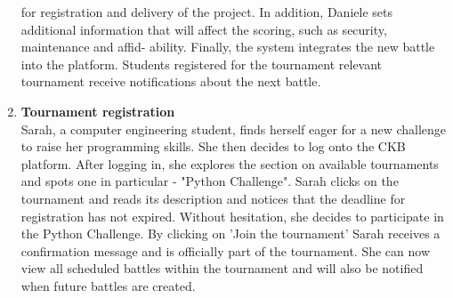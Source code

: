 \begin{enumerate}[label=\textbf{\Alph*}.]
for registration and delivery of the project. In addition, Daniele sets additional information
that will affect the scoring, such as security, maintenance and affid-
ability. Finally, the system integrates the new battle into the platform. Students registered for the tournament
relevant tournament receive notifications about the next battle.
\newpage
\item \textbf{Tournament registration} \\
Sarah, a computer engineering student, finds herself eager for a new challenge to raise her programming skills. She then decides to log onto the CKB platform. After logging in, she explores the section on available tournaments and spots one in particular - "Python Challenge". Sarah clicks on the tournament and reads its description and notices that the deadline for registration has not expired. Without hesitation, she decides to participate in the Python Challenge. By clicking on 'Join the tournament' Sarah receives a confirmation message and is officially part of the tournament. She can now view all scheduled battles within the tournament and will also be notified when future battles are created.


\end{enumerate}
